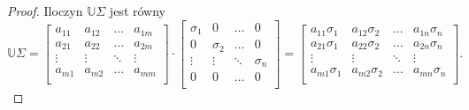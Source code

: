 \documentclass[12pt,a4paper]{report}
\begin{document}
\begin{proof}
Iloczyn $\mathbb{U} \Sigma$ jest równy
$$\mathbb{U} \Sigma = \left[
        \begin{array}{cccc}
         a_{11} & a_{12} & \ldots & a_{1m} \\
         a_{21} & a_{22} & \ldots & a_{2m} \\
         \vdots & \vdots & \ddots & \vdots \\
         a_{m1} & a_{m2} & \ldots & a_{mm} \\
         \end{array}
      \right] \cdot \left[
        \begin{array}{cccc}
         \sigma_{1} & 0 & \ldots & 0 \\
         0 & \sigma_{2} & \ldots & 0 \\
         \vdots & \vdots & \ddots & \sigma_{n} \\
         0 & 0 & \ldots & 0 \\
         \end{array}
      \right] = \left[
        \begin{array}{cccc}
         a_{11} \sigma_{1} & a_{12} \sigma_{2} & \ldots & a_{1n} \sigma_{n} \\
         a_{21} \sigma_{1} & a_{22} \sigma_{2} & \ldots & a_{2n} \sigma_{n}\\
         \vdots & \vdots & \ddots & \vdots \\
         a_{m1} \sigma_{1} & a_{m2} \sigma_{2} & \ldots & a_{mn} \sigma_{n} \\
         \end{array}
      \right].$$
      

\end{proof}
\end{document}

